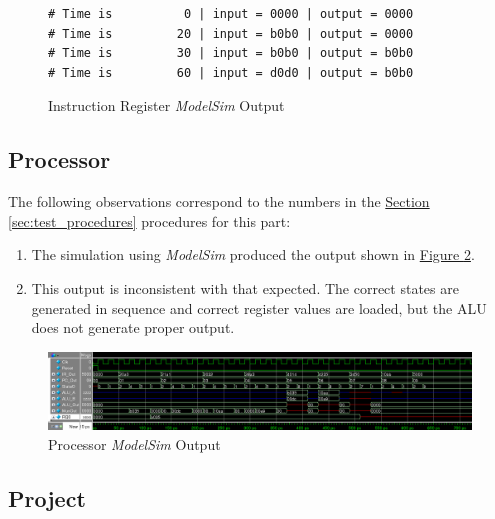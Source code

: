 \begin{figure}[htbp]
    \begin{lstlisting}[numbers=none, basicstyle = \ttfamily\scriptsize]
# Time is          0 | input = 0000 | output = 0000
# Time is         20 | input = b0b0 | output = 0000
# Time is         30 | input = b0b0 | output = b0b0
# Time is         60 | input = d0d0 | output = b0b0
    \end{lstlisting}
    \caption{Instruction Register \emph{ModelSim} Output\label{fig:ir_output}}
\end{figure}


\FloatBarrier \subsection{Processor} %
\label{sub:processor}

The following observations correspond to the numbers in the \hyperref[sec:test_procedures]{Section \ref*{sec:test_procedures}} procedures for this part:

\begin{enumerate}
    \item The simulation using \emph{ModelSim} produced the output shown in \hyperref[fig:processor_output]{Figure \ref*{fig:processor_output}}.
    \item  This output is inconsistent with that expected.
    The correct states are generated in sequence and correct register values are loaded, but the ALU does not generate proper output.
\end{enumerate}

\begin{figure}
    \includegraphics[width=\textwidth]{images/wave.png}
    \caption{Processor \emph{ModelSim} Output\label{fig:processor_output}}
\end{figure}


\FloatBarrier \subsection{Project} %
\label{sub:projects}

